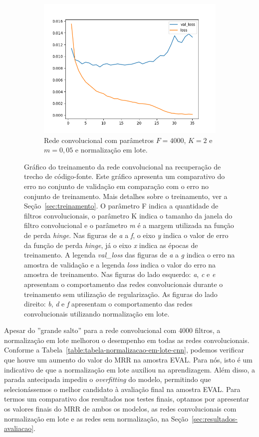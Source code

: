 \begin{figure}[H]
\begin{subfigure}{.5\textwidth}
  \includegraphics[width=.8\linewidth]{figuras/ape-ajustes-hiper-parametros/cnn-with-bn-4000-k-2-m-005.png}
  \caption{Rede convolucional com parâmetros $F = 4000$, $K = 2$ e $m = 0,05$ e normalização em lote.}
  \label{fig:cnn-4000-k-2-m-005-normalizacao-em-lote}
\end{subfigure}

\caption{Gráfico do treinamento da rede convolucional na recuperação de trecho de código-fonte. Este gráfico apresenta um comparativo do erro no conjunto de validação em comparação com o erro no conjunto de treinamento. Mais detalhes sobre o treinamento, ver a Seção~\ref{sec:treinamento}. O parâmetro F indica a quantidade de filtros convolucionais, o parâmetro K indica o tamanho da janela do filtro convolucional e o parâmetro \emph{m} é a margem utilizada na função de perda \textit{hinge}. Nas figuras de \emph{a} a \emph{f}, o eixo \emph{y} indica o valor de erro da função de perda \textit{hinge}, já o eixo \emph{x} indica as épocas de treinamento. A legenda \emph{val\_loss} das figuras de \emph{a} a \emph{g} indica o erro na amostra de validação e a legenda \emph{loss} indica o valor do erro na amostra de treinamento. Nas figuras do lado esquerdo: \emph{a}, \emph{c} e \emph{e} apresentam o comportamento das redes convolucionais durante o treinamento sem utilização de regularização. As figuras do lado direito: \emph{b}, \emph{d} e \emph{f} apresentam o comportamento das redes convolucionais utilizando normalização em lote. }
\label{fig:treinamento-cnn-normalizacao-em-lote}
\end{figure}

Apesar do ''grande salto'' para a rede convolucional com 4000 filtros, a normalização em lote melhorou o desempenho em todas as redes convolucionais. Conforme a Tabela~\ref{table:tabela-normalizacao-em-lote-cnn}, podemos verificar que houve um aumento do valor do MRR na amostra EVAL. Para nós, isto é um indicativo de que a normalização em lote auxiliou na aprendizagem. Além disso, a parada antecipada impediu o \textit{overfitting} do modelo, permitindo que selecionássemos o melhor candidato à avaliação final na amostra EVAL. Para termos um comparativo dos resultados nos testes finais, optamos por apresentar os valores finais do MRR de ambos os modelos, as redes convolucionais com normalização em lote e as redes sem normalização, na Seção~\ref{sec:resultados-avaliacao}.

